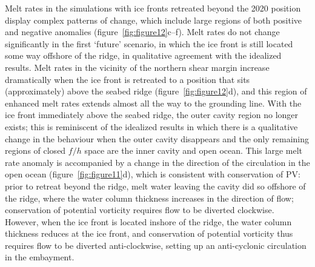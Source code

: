 \documentclass[draft]{agujournal2019}
\begin{document}
Melt rates in the simulations with ice fronts retreated beyond the 2020 position display complex patterns of change, which include large regions of both positive and negative anomalies (figure~\ref{fig:figure12}c--f). Melt rates do not change significantly in the first `future' scenario, in which the ice front is still located some way offshore of the ridge, in qualitative agreement with the idealized results. Melt rates in the vicinity of the northern shear margin increase dramatically when the ice front is retreated to a position that sits (approximately) above the seabed ridge (figure~\ref{fig:figure12}d), and this region of enhanced melt rates extends almost all the way to the grounding line. With the ice front immediately above the seabed ridge, the outer cavity region no longer exists; this is reminiscent of the idealized results in which there is a qualitative change in the behaviour when the outer cavity disappears and the only remaining regions of closed $f/h$ space are the inner cavity and open ocean.  %
This large melt rate anomaly is accompanied by a change in the direction of the circulation in the open ocean (figure~\ref{fig:figure11}d), which is consistent with conservation of PV: prior to retreat beyond the ridge, melt water leaving the cavity did so offshore of the ridge, where the water column thickness increases in the direction of flow; conservation of potential vorticity requires flow to be diverted clockwise. However, when the ice front is located inshore of the ridge, the water column thickness reduces at the ice front, and conservation of potential vorticity thus requires flow to be diverted anti-clockwise, setting up an anti-cyclonic circulation in the embayment. 
\end{document}
